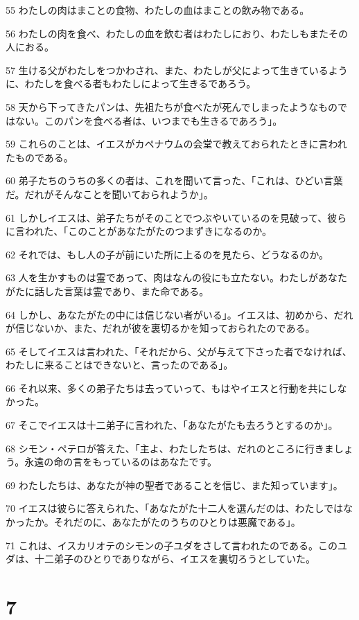 \par 55 わたしの肉はまことの食物、わたしの血はまことの飲み物である。
\par 56 わたしの肉を食べ、わたしの血を飲む者はわたしにおり、わたしもまたその人におる。
\par 57 生ける父がわたしをつかわされ、また、わたしが父によって生きているように、わたしを食べる者もわたしによって生きるであろう。
\par 58 天から下ってきたパンは、先祖たちが食べたが死んでしまったようなものではない。このパンを食べる者は、いつまでも生きるであろう」。
\par 59 これらのことは、イエスがカペナウムの会堂で教えておられたときに言われたものである。
\par 60 弟子たちのうちの多くの者は、これを聞いて言った、「これは、ひどい言葉だ。だれがそんなことを聞いておられようか」。
\par 61 しかしイエスは、弟子たちがそのことでつぶやいているのを見破って、彼らに言われた、「このことがあなたがたのつまずきになるのか。
\par 62 それでは、もし人の子が前にいた所に上るのを見たら、どうなるのか。
\par 63 人を生かすものは霊であって、肉はなんの役にも立たない。わたしがあなたがたに話した言葉は霊であり、また命である。
\par 64 しかし、あなたがたの中には信じない者がいる」。イエスは、初めから、だれが信じないか、また、だれが彼を裏切るかを知っておられたのである。
\par 65 そしてイエスは言われた、「それだから、父が与えて下さった者でなければ、わたしに来ることはできないと、言ったのである」。
\par 66 それ以来、多くの弟子たちは去っていって、もはやイエスと行動を共にしなかった。
\par 67 そこでイエスは十二弟子に言われた、「あなたがたも去ろうとするのか」。
\par 68 シモン・ペテロが答えた、「主よ、わたしたちは、だれのところに行きましょう。永遠の命の言をもっているのはあなたです。
\par 69 わたしたちは、あなたが神の聖者であることを信じ、また知っています」。
\par 70 イエスは彼らに答えられた、「あなたがた十二人を選んだのは、わたしではなかったか。それだのに、あなたがたのうちのひとりは悪魔である」。
\par 71 これは、イスカリオテのシモンの子ユダをさして言われたのである。このユダは、十二弟子のひとりでありながら、イエスを裏切ろうとしていた。

\chapter{7}

